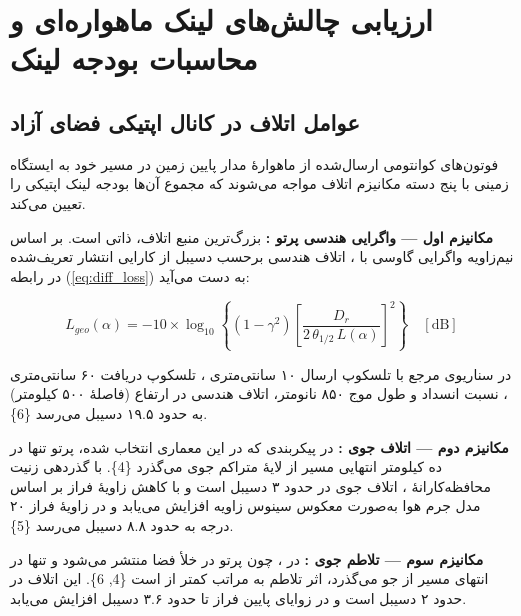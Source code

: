 \documentclass[a4paper,14pt]{extreport}
\begin{document}
\section{ارزیابی چالش‌های لینک  ماهواره‌ای و محاسبات بودجه لینک}
\subsection{عوامل اتلاف در کانال اپتیکی فضای آزاد}

فوتون‌های کوانتومی ارسال‌شده از ماهوارهٔ مدار پایین زمین در مسیر خود به ایستگاه زمینی با پنج دسته مکانیزم اتلاف مواجه می‌شوند که مجموع آن‌ها بودجه لینک اپتیکی را تعیین می‌کند.

\textbf{مکانیزم اول --- واگرایی هندسی پرتو :} بزرگ‌ترین منبع اتلاف، ذاتی است. بر اساس نیم‌زاویه واگرایی گاوسی  با ، اتلاف هندسی برحسب دسیبل از کارایی انتشار تعریف‌شده در رابطه (\ref{eq:diff_loss}) به دست می‌آید:

\begin{equation}
L_{geo}(\alpha) = -10 \times \log_{10}\!\left\{\left(1-\gamma^2\right)\left[\frac{D_r}{2\,\theta_{1/2}\,L(\alpha)}\right]^2\right\} \quad [\text{dB}]
\label{eq:geo_loss}
\end{equation}

در سناریوی مرجع با تلسکوپ ارسال ۱۰ سانتی‌متری ، تلسکوپ دریافت ۶۰ سانتی‌متری ، نسبت انسداد  و طول موج ۸۵۰ نانومتر، اتلاف هندسی در ارتفاع  (فاصلهٔ ۵۰۰ کیلومتر) به حدود ۱۹.۵ دسیبل می‌رسد \{6\}.

\textbf{مکانیزم دوم --- اتلاف جوی :} در پیکربندی  که در این معماری انتخاب شده، پرتو تنها در ده کیلومتر انتهایی مسیر از لایهٔ متراکم جوی می‌گذرد \{4\}. با گذردهی زنیت محافظه‌کارانهٔ ، اتلاف جوی در  حدود ۳ دسیبل است و با کاهش زاویهٔ فراز بر اساس مدل جرم هوا  به‌صورت معکوس سینوس زاویه افزایش می‌یابد و در زاویهٔ فراز ۲۰ درجه به حدود ۸.۸ دسیبل می‌رسد \{5\}.

\textbf{مکانیزم سوم --- تلاطم جوی :} در ، چون پرتو در خلأ فضا منتشر می‌شود و تنها در انتهای مسیر از جو می‌گذرد، اثر تلاطم به مراتب کمتر از  است \{4, 6\}. این اتلاف در  حدود ۲ دسیبل است و در زوایای پایین فراز تا حدود ۳.۶ دسیبل افزایش می‌یابد.
\end{document}
